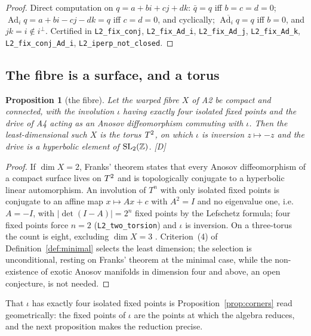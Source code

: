 \documentclass[11pt,a4paper]{article}
\theoremstyle{plain}
\newtheorem{proposition}[theorem]{Proposition}
\theoremstyle{definition}
\theoremstyle{remark}
\newcommand{\Ad}{\operatorname{Ad}}
\newcommand{\rigD}{[\textup{D}]}
\begin{document}
\begin{proof}
Direct computation on $q=a+bi+cj+dk$: $\bar q=q$ iff $b=c=d=0$; $\Ad_{i}q=a+bi-cj-dk=q$ iff $c=d=0$, and cyclically; $\overline{\Ad_{i}q}=q$ iff $b=0$, and $jk=i\notin i^{\perp}$. Certified in \texttt{L2\_fix\_conj}, \texttt{L2\_fix\_Ad\_i}, \texttt{L2\_fix\_Ad\_j}, \texttt{L2\_fix\_Ad\_k}, \texttt{L2\_fix\_conj\_Ad\_i}, \texttt{L2\_iperp\_not\_closed}.
\end{proof}

\subsection{The fibre is a surface, and a torus}

\begin{proposition}[the fibre]\label{prop:surface}
Let the warped fibre $X$ of A2 be compact and connected, with the involution $\iota$ having exactly four isolated fixed points and the drive of A4 acting as an Anosov diffeomorphism commuting with $\iota$. Then the least-dimensional such $X$ is the torus $T^2$, on which $\iota$ is inversion $z\mapsto-z$ and the drive is a hyperbolic element of $\mathrm{SL}_{2}(\mathbb{Z})$. \rigD
\end{proposition}

\begin{proof}
If $\dim X=2$, Franks' theorem \cite{Franks1970} states that every Anosov diffeomorphism of a compact surface lives on $T^2$ and is topologically conjugate to a hyperbolic linear automorphism. An involution of $T^{n}$ with only isolated fixed points is conjugate to an affine map $x\mapsto Ax+c$ with $A^{2}=I$ and no eigenvalue one, i.e.\ $A=-I$, with $\lvert\det(I-A)\rvert=2^{n}$ fixed points by the Lefschetz formula; four fixed points force $n=2$ (\texttt{L2\_two\_torsion}) and $\iota$ is inversion. On a three-torus the count is eight, excluding $\dim X=3$ \cite{FranksNewhouse}. Criterion~(4) of Definition~\ref{def:minimal} selects the least dimension; the selection is unconditional, resting on Franks' theorem at the minimal case, while the non-existence of exotic Anosov manifolds in dimension four and above, an open conjecture, is not needed.
\end{proof}

That $\iota$ has exactly four isolated fixed points is Proposition~\ref{prop:corners} read geometrically: the fixed points of $\iota$ are the points at which the algebra reduces, and the next proposition makes the reduction precise.
\end{document}
